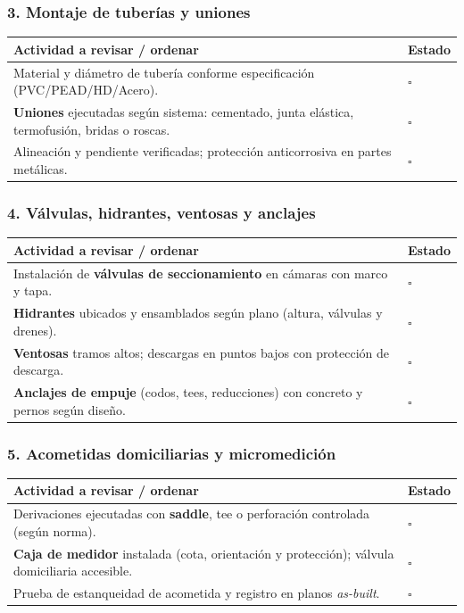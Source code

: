 \documentclass[12pt]{article}
\newcommand{\cbox}{\(\square\)}
\renewcommand{\cbox}{\(\square\)} %
\begin{document}
	\subsubsection*{3. Montaje de tuberías y uniones}
	\begin{tabularx}{\linewidth}{>{\raggedright\arraybackslash}p{0.93\linewidth} >{\centering\arraybackslash}m{0.07\linewidth}}
		\toprule
		\textbf{Actividad a revisar / ordenar} & \textbf{Estado}\\
		\midrule
		Material y diámetro de tubería conforme especificación (PVC/PEAD/HD/Acero). & \cbox \\
		\textbf{Uniones} ejecutadas según sistema: cementado, junta elástica, termofusión, bridas o roscas. & \cbox \\
		Alineación y pendiente verificadas; protección anticorrosiva en partes metálicas. & \cbox \\
		\bottomrule
	\end{tabularx}
	
	\subsubsection*{4. Válvulas, hidrantes, ventosas y anclajes}
	\begin{tabularx}{\linewidth}{>{\raggedright\arraybackslash}p{0.93\linewidth} >{\centering\arraybackslash}m{0.07\linewidth}}
		\toprule
		\textbf{Actividad a revisar / ordenar} & \textbf{Estado}\\
		\midrule
		Instalación de \textbf{válvulas de seccionamiento} en cámaras con marco y tapa. & \cbox \\
		\textbf{Hidrantes} ubicados y ensamblados según plano (altura, válvulas y drenes). & \cbox \\
		\textbf{Ventosas} tramos altos; descargas en puntos bajos con protección de descarga. & \cbox \\
		\textbf{Anclajes de empuje} (codos, tees, reducciones) con concreto y pernos según diseño. & \cbox \\
		\bottomrule
	\end{tabularx}
	
	\subsubsection*{5. Acometidas domiciliarias y micromedición}
	\begin{tabularx}{\linewidth}{>{\raggedright\arraybackslash}p{0.93\linewidth} >{\centering\arraybackslash}m{0.07\linewidth}}
		\toprule
		\textbf{Actividad a revisar / ordenar} & \textbf{Estado}\\
		\midrule
		Derivaciones ejecutadas con \textbf{saddle}, tee o perforación controlada (según norma). & \cbox \\
		\textbf{Caja de medidor} instalada (cota, orientación y protección); válvula domiciliaria accesible. & \cbox \\
		Prueba de estanqueidad de acometida y registro en planos \textit{as-built}. & \cbox \\
		\bottomrule
	\end{tabularx}
	
\end{document}
